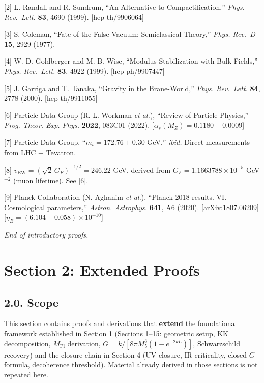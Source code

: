 \documentclass[
  11pt,
]{article}
\begin{document}
{[}2{]} L. Randall and R. Sundrum, ``An Alternative to
Compactification,'' \emph{Phys. Rev.~Lett.} \textbf{83}, 4690 (1999).
{[}hep-th/9906064{]}

{[}3{]} S. Coleman, ``Fate of the False Vacuum: Semiclassical Theory,''
\emph{Phys. Rev.~D} \textbf{15}, 2929 (1977).

{[}4{]} W. D. Goldberger and M. B. Wise, ``Modulus Stabilization with
Bulk Fields,'' \emph{Phys. Rev.~Lett.} \textbf{83}, 4922 (1999).
{[}hep-ph/9907447{]}

{[}5{]} J. Garriga and T. Tanaka, ``Gravity in the Brane-World,''
\emph{Phys. Rev.~Lett.} \textbf{84}, 2778 (2000). {[}hep-th/9911055{]}

{[}6{]} Particle Data Group (R. L. Workman \emph{et al.}), ``Review of
Particle Physics,'' \emph{Prog. Theor. Exp. Phys.} \textbf{2022}, 083C01
(2022). {[}\(\alpha_s(M_Z) = 0.1180 \pm 0.0009\){]}

{[}7{]} Particle Data Group, ``\(m_t = 172.76 \pm 0.30\) GeV,''
\emph{ibid.} Direct measurements from LHC + Tevatron.

{[}8{]} \(v_{\text{EW}} = (\sqrt{2}\,G_F)^{-1/2} = 246.22\) GeV, derived
from \(G_F = 1.1663788 \times 10^{-5}\) GeV\(^{-2}\) (muon lifetime).
See {[}6{]}.

{[}9{]} Planck Collaboration (N. Aghanim \emph{et al.}), ``Planck 2018
results. VI. Cosmological parameters,'' \emph{Astron. Astrophys.}
\textbf{641}, A6 (2020). {[}arXiv:1807.06209{]}
{[}\(\eta_B = (6.104 \pm 0.058) \times 10^{-10}\){]}

\bigskip

\emph{End of introductory proofs.}

\bigskip

\hypertarget{section-2-extended-proofs}{%
\section{Section 2: Extended Proofs}\label{section-2-extended-proofs}}

\bigskip

\hypertarget{scope}{%
\subsection{2.0. Scope}\label{scope}}

This section contains proofs and derivations that \textbf{extend} the
foundational framework established in Section 1 (Sections 1--15:
geometric setup, KK decomposition, \(M_{\text{Pl}}\) derivation,
\(G = k/[8\pi M_5^3(1-e^{-2kL})]\), Schwarzschild recovery) and the
closure chain in Section 4 (UV closure, IR criticality, closed \(G\)
formula, decoherence threshold). Material already derived in those
sections is not repeated here.
\end{document}
